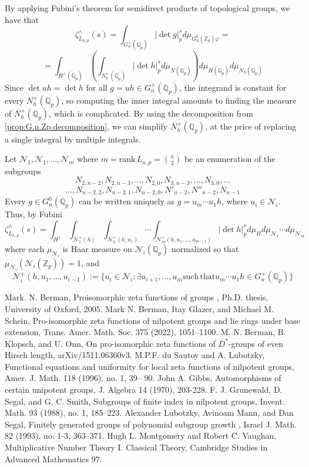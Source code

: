 \documentclass[12pt]{article}
\begin{document}
By applying Fubini's theorem for semidirect products of topological groups, we have that \[\zeta_{L_{n,p}}^{\wedge}(s)=\displaystyle\int_{G_{n}^{+}(\mathbb{Q}_p)}|\det{g}|_p^sd\mu_{G_{n}^{0}(\mathbb{Z}_p)\varphi}=\]\[=\displaystyle\int_{H^+(\mathbb{Q}_p)}\left(\displaystyle\int_{N_{h}^+(\mathbb{Q}_p)}|\det{h}|_p^sd\mu_{N(\mathbb{Q}_p)}\right)d\mu_{H(\mathbb{Q}_p)}d\mu_{N_{h}(\mathbb{Q}_p)}\]
Since $\det{uh}=\det{h}$ for all $g=uh\in{G_{n}^{+}(\mathbb{Q}_{p})}$, the integrand is constant for every $N_{h}^{+}(\mathbb{Q}_{p})$, so computing the inner integral amounts to finding the measure of $N_{h}^+(\mathbb{Q}_p)$, which is complicated. By using the decomposition from \ref{prop:G.n.Zp.decomposition}, we can simplify $N_{h}^{+}(\mathbb{Q}_{p})$, at the price of replacing a single integral by multiple integrals.

Let $\mathcal{N}_{1},\mathcal{N}_{1},\dots,\mathcal{N}_{m}$ where $m=\mathrm{rank}\,L_{n,p}=\binom{n}{2}$ be an enumeration of the subgroups
\[N_{2,n-2},N_{2,n-3},\dots,N_{2,0},N_{3,n-3},\dots,N_{3,0},\dots\]\[\dots,N_{n-2,2},N_{n-2,1},N_{n-2,0},N'_{n-2},N''_{n-2},N_{n-1}\]
Every $g\in{G_{n}^{0}(\mathbb{Q}_{p})}$ can be written uniquely as $g=u_{m}\cdots{u_{1}h}$, where $u_{i}\in{\mathcal{N}_{i}}$. Thus, by Fubini \[
\zeta_{L_{n,p}}^{\wedge}(s)=\displaystyle\int_{H^{+}}\displaystyle\int_{\mathcal{N}_{1}^{+}(h)}\displaystyle\int_{\mathcal{N}_{2}^{+}(h,u_{1})}\cdots\displaystyle\int_{\mathcal{N}_{m}^{+}(h,u_{1},\dots,u_{m-1})}|\det{h}|_{p}^{s}d\mu_{H}d\mu_{\mathcal{N}_{1}}\cdots{d\mu_{\mathcal{N}_{m}}}\]
where each $\mu_{\mathcal{N}_{i}}$ is Haar measure on $\mathcal{N}_{i}(\mathbb{Q}_{p})$ normalized so that $\mu_{\mathcal{N}_{i}}(\mathcal{N}_{i}(\mathbb{Z}_{p}))=1$, and \[\mathcal{N}_{i}^{+}(h,u_{1},\dots,u_{i-1}):=\{u_{i}\in\mathcal{N}_{i} : \exists{u_{i+1},\dots,u_{m}} \mathrm{such}\,\mathrm{that} u_{m}\cdots{u_{1}}h\in{G_{n}^{+}(\mathbb{Q}_{p})}\}\]
\begin{thebibliography}{2}
 Mark. N. Berman,
Proisomorphic zeta functions of groups
, Ph.D. thesis, University of Oxford,
2005.
 Mark N. Berman, Itay Glazer, and Michael M. Schein, Pro-isomorphic zeta functions of nilpotent groups and lie rings under base extension, Trans. Amer. Math. Soc. 375 (2022), 1051–1100.
 M. N. Berman, B. Klopsch, and U. Onn,
On pro-isomorphic zeta functions of $D^{\ast}$-groups of even Hirsch length, arXiv/1511.06360v3.
 M.P.F. du Sautoy and A. Lubotzky, Functional equations and uniformity for
local zeta functions of nilpotent groups, Amer. J. Math. 118 (1996), no. 1, 39–
90.
 John A. Gibbs, Automorphisms of certain unipotent groups, J. Algebra 14 (1970), 203-228.
 F. J. Grunewald, D. Segal, and G. C. Smith, Subgroups of finite index in nilpotent groups,
Invent. Math. 93 (1988), no. 1, 185–223.
 Alexander Lubotzky, Avinoam Mann, and Dan Segal,
Finitely generated groups of polynomial
subgroup growth
, Israel J. Math.
82
(1993), no. 1-3, 363–371.
 Hugh L. Montgomery and Robert C. Vaughan, Multiplicative Number Theory I. Classical Theory, Cambridge Studies in Advanced Mathematics 97.
\end{thebibliography}
\end{document}
